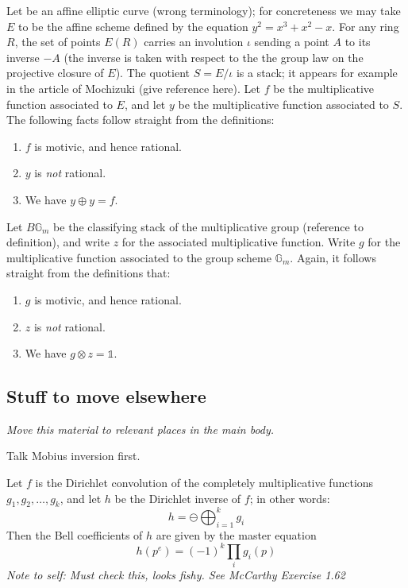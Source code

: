 Let be an affine elliptic curve (wrong terminology); for concreteness we may take $E$ to be the affine scheme defined by the equation $y^2 = x^3 + x^2 - x$. For any ring $R$, the set of points $E(R)$ carries an involution $\iota$ sending a point $A$ to its inverse $-A$ (the inverse is taken with respect to the the group law on the projective closure of $E$). The quotient $S = E/ \iota$ is a stack; it appears for example in the article of Mochizuki (give reference here). Let $f$ be the multiplicative function associated to $E$, and let $y$ be the multiplicative function associated to $S$. The following facts follow straight from the definitions:
\begin{enumerate}
\item $f$ is motivic, and hence rational.
\item $y$ is \emph{not} rational.
\item We have $y \oplus y = f$. 
\end{enumerate}

Let $B \mathbb{G}_m$ be the classifying stack of the multiplicative group (reference to definition), and write $z$ for the associated multiplicative function. Write $g$ for the multiplicative function associated to the group scheme $\mathbb{G}_m$. Again, it follows straight from the definitions that:
\begin{enumerate}
\item $g$ is motivic, and hence rational.
\item $z$ is \emph{not} rational.
\item We have $g \otimes z = \mathbb{1}$. 
\end{enumerate}



\subsection*{Stuff to move elsewhere}

\emph{Move this material to relevant places in the main body.}

Talk Mobius inversion first.

\begin{example}
Let $f$ is the Dirichlet convolution of the completely multiplicative functions $g_1, g_2, \ldots, g_k$, and let $h$ be the Dirichlet inverse of $f$; in other words:
$$  h = \ominus \bigoplus_{i=1}^k g_i  $$
Then the Bell coefficients of $h$ are given by the master equation
$$  h(p^e) = (-1)^k \prod_i g_i(p)  $$
\emph{Note to self: Must check this, looks fishy. See McCarthy Exercise 1.62}

\end{example}

